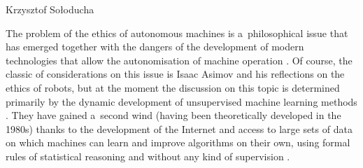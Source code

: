 \begin{artengenv}{Krzysztof Sołoducha}
	
%
%
%
%
%



\lettrine[loversize=0.13,lines=2,lraise=-0.03,nindent=0em,findent=0.2pt]%
{T}{}he problem of the ethics of autonomous machines is a~philosophical issue that has emerged together with the dangers of the development of modern technologies that allow the autonomisation of machine operation
\parencite[][]{pasquale_black_2016}. %
 Of course, the classic of considerations on this issue is Isaac Asimov 
\parencite*[][]{asimov_runaround_2004} %
 and his reflections on the ethics of robots, but at the moment the discussion on this topic is determined primarily by the dynamic development of unsupervised machine learning methods 
\parencite[][]{gryz_sztuczna_2021}. %
 They have gained a~second wind (having been theoretically developed in the 1980s) thanks to the development of the Internet and access to large sets of data on which machines can learn and improve algorithms on their own, using formal rules of statistical reasoning and without any kind of supervision 
\parencite[][]{burrell_how_2016}.%



\end{artengenv}
